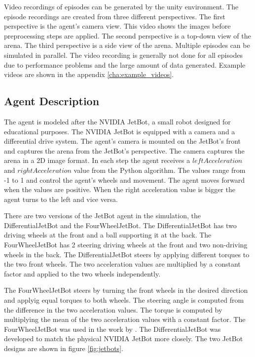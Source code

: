 Video recordings of episodes can be generated by the unity environment. The episode recordings are created from three different perspectives. The first perspective is the agent's camera view. This video shows the images before preprocessing steps are applied. The second perspective is a top-down view of the arena. The third perspective is a side view of the arena.
Multiple episodes can be simulated in parallel. The video recording is generally not done for all episodes due to performance problems and the large amount of data generated.
Example videos are shown in the appendix \ref{cha:example_videos}.


\subsection{Agent Description}
\label{cha:agent_description}

The agent is modeled after the NVIDIA JetBot, a small robot designed for educational purposes. The NVIDIA JetBot is equipped with a camera and a differential drive system. The agent's camera is mounted on the JetBot's front and captures the arena from the JetBot's perspective. The camera captures the arena in a 2D image format. In each step the agent receives a $leftAcceleration$ and $rightAcceleration$ value from the Python algorithm. The values range from -1 to 1 and control the agent's wheels and movement. The agent moves forward when the values are positive. When the right acceleration value is bigger the agent turns to the left and vice versa.

There are two versions of the JetBot agent in the simulation, the DifferentialJetBot and the FourWheelJetBot. The DifferentialJetBot has two driving wheels at the front and a ball supporting it at the back. The FourWheelJetBot has 2 steering driving wheels at the front and two non-driving wheels in the back. The DifferentialJetBot steers by applying different torques to the two front wheels. The two acceleration values are multiplied by a constant factor and applied to the two wheels independently.

The FourWheelJetBot steers by turning the front wheels in the desired direction and applyig equal torques to both wheels. The steering angle is computed from the difference in the two acceleration values. The torque is computed by multiplying the mean of the two acceleration values with a constant factor.
The FourWheelJetBot was used in the work by \autocite{maximilian}. The DifferentialJetBot was developed to match the physical NVIDIA JetBot more closely. The two JetBot designs are shown in figure \ref{fig:jetbots}.


